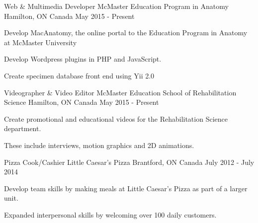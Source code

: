 


\begin{cventries}


\cventry
{Web \& Multimedia Developer} %
{McMaster Education Program in Anatomy} %
{Hamilton, ON Canada} %
{May 2015 - Present} %
{ %
\begin{cvitems}
\item {Develop MacAnatomy, the online portal to the Education Program in 
Anatomy at McMaster University}
\item {Develop Wordpress plugins in PHP and JavaScript.}
\item {Create specimen database front end using Yii 2.0}
\end{cvitems}
}


\cventry
{Videographer \& Video Editor} %
{McMaster Education School of Rehabilitation Science} %
{Hamilton, ON Canada} %
{May 2015 - Present} %
{ %
\begin{cvitems}
\item {Create promotional and educational videos for the Rehabilitation Science 
department.}
\item {These include interviews, motion graphics and 2D animations.}
\end{cvitems}
}


\cventry
{Pizza Cook/Cashier} %
{Little Caesar's Pizza} %
{Brantford, ON Canada} %
{July 2012 - July 2014} %
{ %
\begin{cvitems}
\item {Develop team skills by making meals at Little Caesar's Pizza as part of 
a larger unit.}
\item {Expanded interpersonal skills by welcoming over 100 daily customers.}
\end{cvitems} 
}


\end{cventries}
